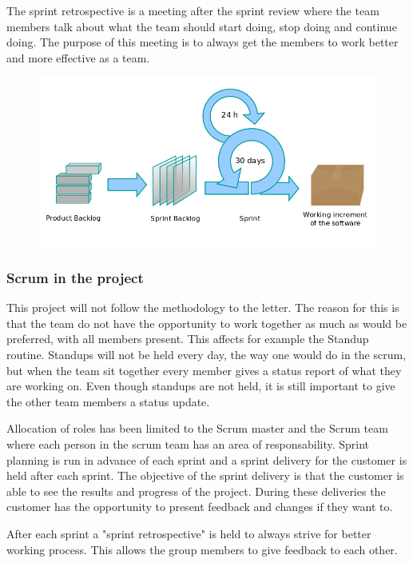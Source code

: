 The sprint retrospective is a meeting after the sprint review where the team members talk about what 
the team should start doing, stop doing and continue doing. The purpose of this meeting is to always 
get the members to work better and more effective as a team. \cite{wikiAgile}

\begin{figure}[!ht]
    \includegraphics[scale=0.4]{pictures/Scrumprocess.png}
\end{figure}

\subsubsection{Scrum in the project}

This project will not follow the methodology to the letter. The reason for this is that the team do 
not have the opportunity to work together as much as would be preferred, with all members present. This affects
for example the Standup routine. Standups will not be held every day, the way one would do in the scrum,
but when the team sit together every member gives a status report of what they are working on. Even though standups are not held, it is still important to give the other team members a status update.

Allocation of roles has been limited to the Scrum master and the Scrum team where each person in the scrum team has an area of responsability. Sprint planning is run in advance of each sprint and a sprint delivery for the customer 
is held after each sprint. The objective of the sprint delivery is that the customer is able to see the results and progress of the project. During these deliveries the customer has the opportunity to present feedback and changes 
if they want to.

After each sprint a "sprint retrospective" is held to always strive for better working 
process. This allows the group members to give feedback to each other.

